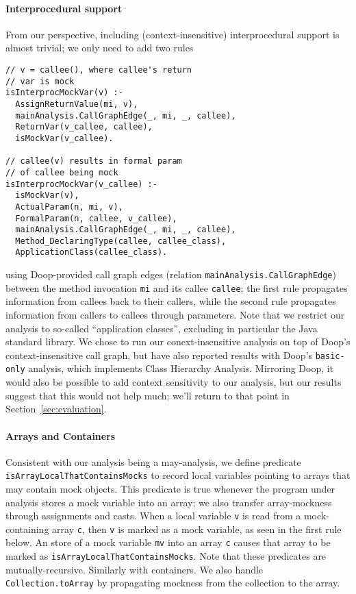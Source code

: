 \paragraph{Interprocedural support} From our perspective, including (context-insensitive) interprocedural support is almost trivial; we only need to add two rules
\begin{lstlisting}[basicstyle=\ttfamily\small,numbers=none]
// v = callee(), where callee's return 
// var is mock
isInterprocMockVar(v) :-
  AssignReturnValue(mi, v),
  mainAnalysis.CallGraphEdge(_, mi, _, callee),
  ReturnVar(v_callee, callee),
  isMockVar(v_callee).

// callee(v) results in formal param 
// of callee being mock
isInterprocMockVar(v_callee) :-
  isMockVar(v),
  ActualParam(n, mi, v),
  FormalParam(n, callee, v_callee),
  mainAnalysis.CallGraphEdge(_, mi, _, callee),
  Method_DeclaringType(callee, callee_class),
  ApplicationClass(callee_class).
\end{lstlisting}
using Doop-provided call graph edges (relation \texttt{mainAnalysis.CallGraphEdge}) between the method invocation {\tt mi} and its callee {\tt callee}; the first rule propagates information from callees back to their callers, while the second rule propagates information from callers to callees through parameters. Note that we restrict our analysis to so-called ``application classes'', excluding in particular the Java standard library. We chose to run our conext-insensitive analysis on top of Doop's context-insensitive call graph, but have also reported results with Doop's \texttt{basic-only} analysis, which implements Class Hierarchy Analysis. Mirroring Doop, it would also be possible to add context sensitivity to our analysis, but our results suggest that this would not help much; we'll return to that point in Section~\ref{sec:evaluation}.

\paragraph{Arrays and Containers} Consistent with our analysis being a may-analysis, we define predicate {\tt isArrayLocalThatContainsMocks} to record local variables pointing to arrays that may contain mock objects. This predicate is true whenever the program under analysis stores a mock variable into an array; we also transfer array-mockness through assignments and casts. When a local variable \texttt{v} is read from a mock-containing array \texttt{c}, then \texttt{v} is marked as a mock variable, as seen in the first rule below. An store of a mock variable \texttt{mv} into an array \texttt{c} causes that array to be marked as \texttt{isArrayLocalThatContainsMocks}. Note that these predicates are mutually-recursive. Similarly with containers. We also handle {\tt Collection.toArray} by propagating mockness from the collection to the array.

